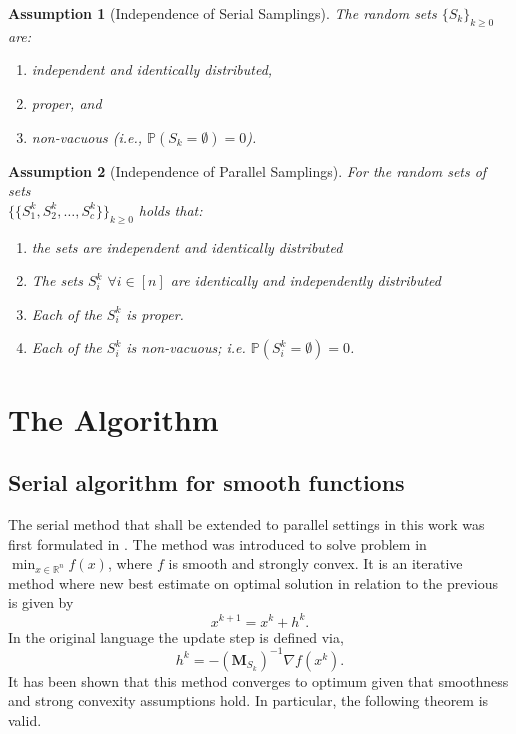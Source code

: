 \documentclass[11pt]{article}
\newtheorem{assumption}{Assumption}
\begin{document}
\begin{assumption}[Independence of Serial Samplings]
	The random sets $\{S_k\}_{k\geq0}$ are:
	\begin{enumerate}
		\item independent and identically distributed, 
		\item proper, and 
		\item non-vacuous (i.e., $\mathbb{P}(S_k=\emptyset)=0$).
	\end{enumerate}
\end{assumption}


\begin{assumption}[Independence of Parallel Samplings]\label{ass:parallel_sample}
	For the random sets of sets \\
	$\{\{S^k_1,S^k_2,\dots,S^k_c\}\}_{k\geq0}$ holds that:
	\begin{enumerate}
		\item the sets are independent and identically distributed
		\item The sets $S^k_i$ $\forall i \in [n]$ are identically and independently distributed
		\item Each of the $S^k_i$ is proper.
		\item Each of the $S^k_i$ is non-vacuous; i.e. $\mathbb{P}(S^k_i=\emptyset)=0$.
	\end{enumerate}
\end{assumption}


	
	\section{The Algorithm}
	
	
		
	\subsection{Serial algorithm for smooth functions}
	The serial method that shall be extended to parallel settings in this work was first formulated in \cite{SDNA}. The method was introduced to solve problem in $\min_{x \in \mathbb{R}^n} f(x)$, where $f$ is smooth and strongly convex. It is an iterative method where new best estimate on optimal solution in relation to the previous is given by
	\begin{equation}\label{eq:iter}
		x^{k+1}=x^{k}+h^k.
	\end{equation}
	In the original language the update step is defined via,
	\begin{equation}
		h^k=-(\mathbf{M}_{S_k})^{-1}\nabla f(x^k). 
	\end{equation}
	It has been shown that this method converges to optimum given that smoothness and strong convexity assumptions hold. In particular, the following theorem is valid. 
	
\end{document}
